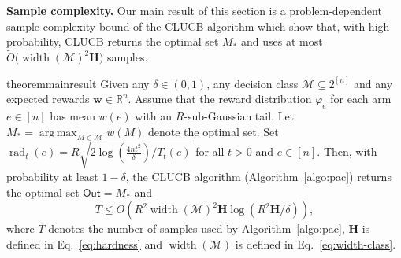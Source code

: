 \documentclass{article}
\newcommand{\junk}[1]{}
\newcommand{\Algorithm}{{\small \textsf{CLUCB}}\xspace}
\newcommand{\Rew}{\varphi}
\newcommand{\M}{\mathcal M}
\newcommand{\B}{\mathcal B}
\newcommand{\RR}{\mathbb R}
\DeclareMathOperator{\rank}{width}
\DeclareMathOperator{\rad}{rad}
\DeclareMathOperator*{\argmax}{arg\,max}
\newcommand{\out}{\mathsf{Out}}
\newcommand{\MultiIdent}{\textsc{TopK}\xspace}
\newcommand{\Matroid}{\textsc{Matroid}\xspace}
\newcommand{\Match}{\textsc{Match}\xspace}
\newcommand{\Path}{\textsc{Path}\xspace}
\renewcommand{\vec}[1]{\boldsymbol{#1}}
\begin{document}
\textbf{Sample complexity.} 
Our main result of this section is a problem-dependent sample complexity bound of the \Algorithm algorithm which show that, with high probability, \Algorithm returns the optimal set $M_*$ and uses at most $\tilde O\big(\rank(\M)^2 \mathbf H\big)$ samples.
\begin{restatable}{theorem}{mainresult}
Given any $\delta \in (0,1)$, any decision class $\M \subseteq 2^{[n]}$ and any expected rewards $\vec w \in \RR^{n}$.
Assume that the reward distribution $\Rew_e$ for each arm $e\in [n]$ has mean $w(e)$ with an $R$-sub-Gaussian tail.
Let $M_* = \argmax_{M\in \M} w(M)$ denote the optimal set.
Set $\rad_t(e) = R\sqrt{2\log\left(\frac{4n t^2}\delta\right)/ T_t(e) }$ for all $t > 0$ and $e\in[n]$.
Then, with probability at least $1-\delta$, the \Algorithm algorithm (Algorithm~\ref{algo:pac}) returns the optimal set $\out=M_*$ and
\begin{equation}
\label{eq:sample-complexity}
T \le O\left(R^2\rank(\M)^2\mathbf H\log\left(R^2 \mathbf H /\delta\right)\right),
\end{equation}
where $T$ denotes the number of samples used by Algorithm~\ref{algo:pac}, $\mathbf H$ is defined in Eq.~\eqref{eq:hardness} and $\rank(\M)$ is defined in Eq.~\eqref{eq:width-class}.
\label{theorem:main}
\end{restatable}
\junk{
By combining Lemma~\ref{lemma:example-exchange-class} and Theorem~\ref{theorem:main}, we can bound the sample complexity of \Algorithm for our running examples.
\begin{corollary}
\begin{itemize}
	\item \MultiIdent. $T \le O\big(\mathbf H \log(n\mathbf H/\delta)\big)$.
	\item \Matroid. $T \le O\big(\mathbf H \log(n\mathbf H/\delta)\big)$.
	\item \Match. $T \le O\big(|V|^2 \mathbf H \log(n |V|^2 \mathbf H/\delta)\big)$.
	\item \Path. $T \le O\big(|V|^2 \mathbf H \log(n |V|^2 \mathbf H/\delta)\big)$.
\end{itemize}
\end{corollary}
}


\vspace{-0.8em}
\end{document}
